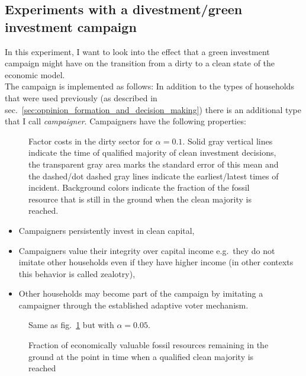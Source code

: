 \subsection{Experiments with a divestment/green investment campaign}
In this experiment, I want to look into the effect that a green investment campaign might have on the transition from a dirty to a clean state of the economic model.\\
The campaign is implemented as follows: In addition to the types of households that were used previously (as described in sec.~\ref{sec:oppinion_formation_and_decision_making}) there is an additional type that I call \textit{campaigner}. Campaigners have the following properties:
\begin{figure}[t]
	\centering
	\caption{Factor costs in the dirty sector for $\alpha = 0.1$. Solid gray vertical lines indicate the time of qualified majority of clean investment decisions, the transparent gray area marks the standard error of this mean and the dashed/dot dashed gray lines indicate the earliest/latest times of incident. Background colors indicate the fraction of the fossil resource that is still in the ground when the clean majority is reached.}
	\label{fig:campaign_dirty_cost0o1}
\end{figure}
\begin{itemize}
	\item Campaigners persistently invest in clean capital,
	\item Campaigners value their integrity over capital income e.g.\ they do not imitate other households even if they have higher income (in other contexts this behavior is called zealotry),
	\item Other households may become part of the campaign by imitating a campaigner through the established adaptive voter mechanism.
\end{itemize}
\begin{figure}[t]
	\centering
	\caption{Same as fig.~\ref{fig:campaign_dirty_cost0o1} but with $\alpha = 0.05$.}
	\label{fig:campaign_dirty_cost0o05}
\end{figure}


\begin{figure}
	\vspace{-.4 cm}
	\caption{Fraction of economically valuable fossil resources remaining in the ground at the point in time when a qualified clean majority is reached \label{fig:remaining_reserves}}
\end{figure}

